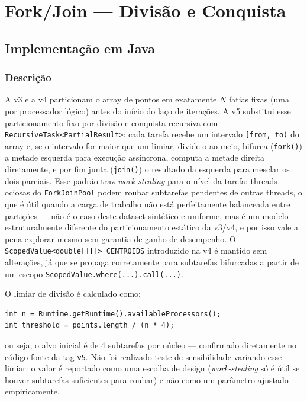 \section{Fork/Join --- Divisão e Conquista}
\label{sec:forkjoin}

\subsection{Implementação em Java}

\subsubsection{Descrição}

A v3 e a v4 particionam o array de pontos em exatamente $N$ fatias fixas
(uma por processador lógico) antes do início do laço de iterações. A v5
substitui esse particionamento fixo por divisão-e-conquista recursiva
com \texttt{RecursiveTask<PartialResult>}: cada tarefa recebe um
intervalo \texttt{[from, to)} do array e, se o intervalo for maior que
um limiar, divide-o ao meio, bifurca (\texttt{fork()}) a metade
esquerda para execução assíncrona, computa a metade direita
diretamente, e por fim junta (\texttt{join()}) o resultado da esquerda
para mesclar os dois parciais. Esse padrão traz \emph{work-stealing}
para o nível da tarefa: threads ociosas do \texttt{ForkJoinPool} podem
roubar subtarefas pendentes de outras threads, o que é útil quando a
carga de trabalho não está perfeitamente balanceada entre partições ---
não é o caso deste dataset sintético e uniforme, mas é um modelo
estruturalmente diferente do particionamento estático da v3/v4, e por
isso vale a pena explorar mesmo sem garantia de ganho de desempenho. O
\texttt{ScopedValue<double[][]> CENTROIDS} introduzido na v4 é mantido
sem alterações, já que se propaga corretamente para subtarefas
bifurcadas a partir de um escopo \texttt{ScopedValue.where(...).call(...)}.

O limiar de divisão é calculado como:

\begin{verbatim}
int n = Runtime.getRuntime().availableProcessors();
int threshold = points.length / (n * 4);
\end{verbatim}

ou seja, o alvo inicial é de 4 subtarefas por núcleo --- confirmado
diretamente no código-fonte da tag \texttt{v5}. Não foi realizado teste
de sensibilidade variando esse limiar: o valor é reportado como uma
escolha de design (\textit{work-stealing} só é útil se houver
subtarefas suficientes para roubar) e não como um parâmetro ajustado
empiricamente.

